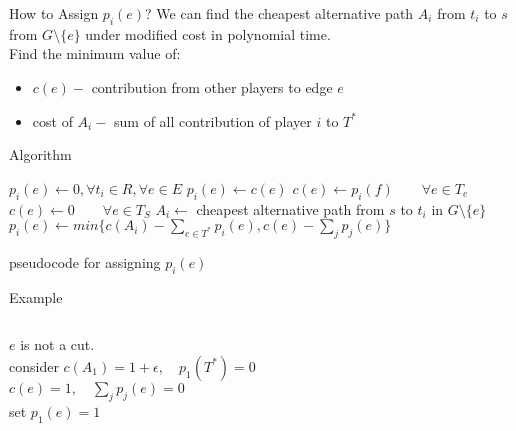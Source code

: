 \documentclass[11pt,aspectratio=169]{beamer}
\begin{document}
\begin{frame}{How to Assign \(p_i(e)\)?}
    We can find the cheapest alternative path \(A_i\) from \(t_i\) to \(s\) from \(G \setminus \{e\}\) under modified cost in polynomial time. \\
    \vspace{10pt}
    Find the minimum value of:
    \begin{itemize}
        \item $c(e) - $ contribution from other players to edge \(e\)
        \item cost of \(A_i-\) sum of all contribution of player \(i\) to \(T^*\) 
    \end{itemize}
\end{frame}

\begin{frame}{Algorithm}
\begin{algorithm}[H]
\begin{algorithmic}[1]
    \STATE $p_i(e) \gets 0, \forall t_i \in R, \forall e \in E$ 
    \STATE $p_i(e) \gets c(e)$
    \ELSE
    \STATE \(c(e) \gets p_i(f)  \qquad \forall e \in T_e\) 
	\STATE \(c(e) \gets 0 \qquad \forall e \in T_S\) 
    \STATE $A_i \gets$ cheapest alternative path from \(s\) to \(t_i\) in $G\setminus\{e\}$ 
    \STATE \(p_i(e) \gets min\{c(A_i) - \sum_{e\in T^*}p_i(e),c(e)-\sum_{j}p_j(e) \}\)
    \ENDIF
    \ENDWHILE
\end{algorithmic}
\caption{pseudocode for assigning $p_i(e)$ }
\label{alg:seq}
\end{algorithm}
\end{frame}

\begin{frame}{Example}
\begin{columns}
    \centering
\doublespacing
$e$ is not a cut.\\
consider $c(A_1) = 1+\epsilon, \quad p_1(T^*) = 0$\\
$c(e) = 1, \quad  \sum_{j}p_j(e) = 0$\\
set $p_1(e) = 1$
\end{columns}
\end{frame}
\end{document}
